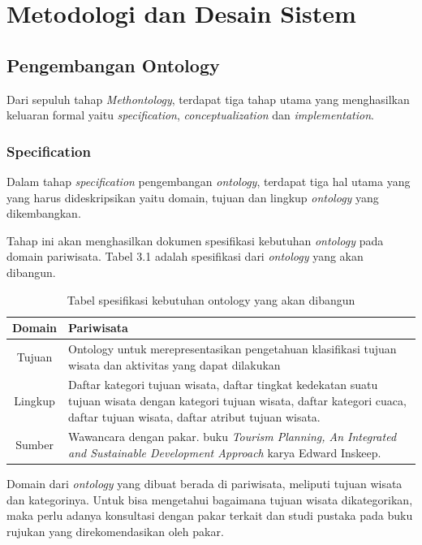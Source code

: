 \chapter{Metodologi dan Desain Sistem}

\section{Pengembangan Ontology}
Dari sepuluh tahap \textit{Methontology}, terdapat tiga tahap utama yang menghasilkan keluaran formal 
yaitu \textit{specification}, \textit{conceptualization} dan \textit{implementation}.
\par

\subsection{Specification}
Dalam tahap \textit{specification} pengembangan \textit{ontology}, terdapat tiga hal utama yang yang harus dideskripsikan yaitu domain, tujuan dan lingkup \textit{ontology}
yang dikembangkan.
\par
Tahap ini akan menghasilkan dokumen spesifikasi kebutuhan \textit{ontology} pada domain pariwisata. Tabel 3.1 adalah spesifikasi dari \textit{ontology} yang akan dibangun.

\begin{table}[h]
\begin{center}
\begin{tabular}{ |c|m{12cm}| } 
\hline
	Domain & Pariwisata \\
	\hline
	Tujuan & Ontology untuk merepresentasikan pengetahuan klasifikasi tujuan wisata dan aktivitas yang dapat dilakukan\\
	\hline
	Lingkup & Daftar kategori tujuan wisata, daftar tingkat kedekatan suatu tujuan wisata dengan kategori tujuan wisata, daftar kategori cuaca, daftar tujuan wisata,
	daftar atribut tujuan wisata. \\ 
	\hline
	Sumber & Wawancara dengan pakar. \newline 
	buku \textit{Tourism Planning, An Integrated and Sustainable Development Approach} karya Edward Inskeep. \\
	\hline
\end{tabular}
\end{center}
\caption{Tabel spesifikasi kebutuhan ontology yang akan dibangun}
\label{table2}
\end{table}

Domain dari \textit{ontology} yang dibuat berada di pariwisata, meliputi tujuan wisata dan kategorinya. Untuk bisa mengetahui bagaimana tujuan wisata dikategorikan,
maka perlu adanya konsultasi dengan pakar terkait dan studi pustaka pada buku rujukan yang direkomendasikan oleh pakar.

